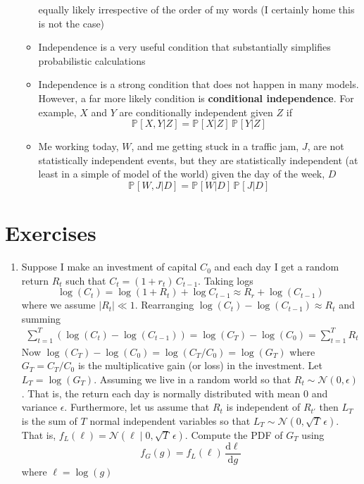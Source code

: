 \documentclass[11pt]{article}
\newcommand{\Prob}[2][]{\mathbb{P}_{#1\!}\left[ #2 \right]}
\newcommand{\logg}[1]{\log\!\left( #1 \right)}
\newcommand{\bra}[1]{\left( #1 \right)}
\newcommand{\dd}{\mathrm{d}}
\begin{document}
\begin{itemize}
\begin{itemize}
equally likely irrespective of the order of my words (I
certainly home this is not the case)
\item Independence is a very useful condition that substantially
simplifies probabilistic calculations
\item Independence is a strong condition that does not happen in many
models. However, a far more likely condition is \textbf{conditional
independence}.  For example, \(X\) and \(Y\) are conditionally
independent given \(Z\) if
$$ \Prob{X, Y |Z} = \Prob{X|Z} \, \Prob{Y|Z}$$
\item Me working today, \(W\), and me getting stuck in a traffic jam,
\(J\), are not statistically independent events, but they are
statistically independent (at least in a simple of model of the
world) given the day of the week, \(D\)
$$ \Prob{W, J |D} = \Prob{W|D} \, \Prob{J|D}$$
\end{itemize}
\end{itemize}



\section{Exercises}
\label{sec:org88f5b62}
\begin{enumerate}
\item Suppose I make an investment of capital \(C_{0}\) and each day I
get a random return \(R_{t}\) such that \(C_{t} =
     (1+r_{t})\,C_{t-1}\). Taking logs
$$ \logg{C_{t}} = \log(1 + R_{t}) + \log{C_{t-1}} \approx
     R_{r}+\logg{C_{t-1}}$$
where we assume \(|R_{t}| \ll 1\).  Rearranging \(\logg{C_{t}} -
     \logg{C_{t-1}} \approx R_{t}\) and summing
\begin{align*}
\sum_{t=1}^{T} \bra{\logg{C_{t}} - \logg{C_{t-1}}} =
\logg{C_{T}} - \logg{C_{0}} = \sum_{{t=1}}^{T} R_{t}
\end{align*}
Now \(\logg{C_{T}} - \logg{C_{0}} = \logg{C_{T}/C_{0}} =
     \logg{G_{T}}\) where \(G_{T}=C_{T}/C_{0}\) is the multiplicative
gain (or loss) in the investment. Let \(L_{T} = \logg{G_{T}}\).
Assuming we live in a random world so that \(R_{t} \sim
     \mathcal{N}(0,\epsilon)\). That is, the return each day is
normally distributed with mean 0 and variance \(\epsilon\).
Furthermore, let us assume that \(R_{t}\) is independent of
\(R_{t'}\) then \(L_{T}\) is the sum of \(T\) normal independent
variables so that \(L_{T}\sim \mathcal{N}(0, \sqrt{T}\,\epsilon)\).
That is, \(f_{L}(\ell) = \mathcal{N}(\ell\mid 0,
     \sqrt{T}\,\epsilon)\). Compute the PDF of \(G_{T}\) using
$$f_{G}(g) = f_{L}(\ell) \, \frac{\dd \ell}{\dd g}$$
where \(\ell = \log(g)\)
\end{enumerate}
\end{document}
